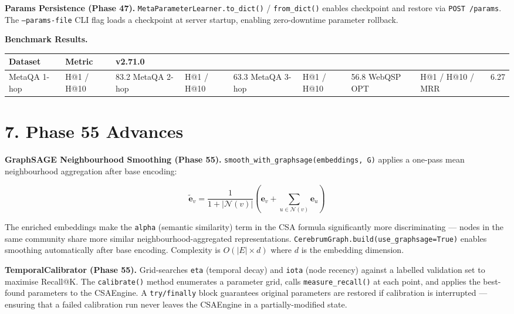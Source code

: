 \textbf{Params Persistence (Phase 47).} \texttt{MetaParameterLearner.to\_dict()} / \texttt{from\_dict()} enables checkpoint and restore via \texttt{POST /params}. The \texttt{--params-file} CLI flag loads a checkpoint at server startup, enabling zero-downtime parameter rollback.

\textbf{Benchmark Results.}

\begin{table}[h]
\small\centering
\begin{tabular}{lll}
\toprule
Dataset & Metric & v2.71.0 \\
\midrule
MetaQA 1-hop & H@1 / H@10 & 83.2%
MetaQA 2-hop & H@1 / H@10 & 63.3%
MetaQA 3-hop & H@1 / H@10 & 56.8%
WebQSP OPT & H@1 / H@10 / MRR & 6.27%
\bottomrule
\end{tabular}
\end{table}


\section*{7. Phase 55 Advances}

\textbf{GraphSAGE Neighbourhood Smoothing (Phase 55).} \texttt{smooth\_with\_graphsage(embeddings, G)} applies a one-pass mean neighbourhood aggregation after base encoding:

$$\tilde{\mathbf{e}}_v = \frac{1}{1+|\mathcal{N}(v)|}\left(\mathbf{e}_v + \sum_{u \in \mathcal{N}(v)} \mathbf{e}_u\right)$$

The enriched embeddings make the \texttt{alpha} (semantic similarity) term in the CSA formula significantly more discriminating --- nodes in the same community share more similar neighbourhood-aggregated representations. \texttt{CerebrumGraph.build(use\_graphsage=True)} enables smoothing automatically after base encoding. Complexity is $O(|E| \times d)$ where $d$ is the embedding dimension.

\textbf{TemporalCalibrator (Phase 55).} Grid-searches \texttt{eta} (temporal decay) and \texttt{iota} (node recency) against a labelled validation set to maximise Recall@K. The \texttt{calibrate()} method enumerates a parameter grid, calls \texttt{measure\_recall()} at each point, and applies the best-found parameters to the CSAEngine. A \texttt{try/finally} block guarantees original parameters are restored if calibration is interrupted --- ensuring that a failed calibration run never leaves the CSAEngine in a partially-modified state.

